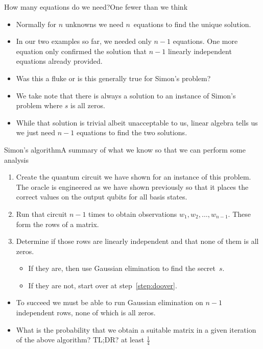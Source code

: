 \begin{frame}{How many equations do we need?}{One fewer than we think}

\begin{itemize}[<+->]
    \item Normally for $n$ unknowns we need $n$~equations to find the unique solution.
    \item In our two examples so far, we needed only $n-1$ equations. One more equation only confirmed the solution that $n-1$ linearly independent equations already provided.
    \item Was this a fluke or is this generally true for Simon's problem?
    \item We take note that there is always a solution to an instance of Simon's problem where $s$ is all zeros.  
    \item While that solution is trivial albeit unacceptable to us, linear algebra tells us we just need $n-1$ equations to find the two solutions.
\end{itemize}
    
\end{frame}

\begin{frame}{Simon's algorithm}{A summary of what we know so that we can perform some analysis}

\begin{enumerate}
    \item Create the quantum circuit we have shown for an instance of this problem.  The oracle is engineered as we have shown previously so that it places the correct values on the output qubits for all basis states.
    \item\label{step:doover} Run that circuit $n-1$ times to obtain observations $w_{1}, w_{2}, \ldots, w_{n-1}$.  These form the rows of a matrix.
    \item Determine if those rows are linearly independent and that none of them is all zeros.
    \begin{itemize}
        \item If they are, then use Gaussian elimination to find the secret~$s$.
        \item If they are not, start over at step~\ref{step:doover}.
    \end{itemize}
\end{enumerate}
\begin{itemize}
    \item<2-> To succeed we must be able to run Gaussian elimination on $n-1$ independent rows, none of which is all zeros.
    \item<3-> What is the probability that we obtain a suitable matrix in a given iteration of the above algorithm?  \alert{TL;DR? at least $\frac{1}{4}$}
\end{itemize}
\end{frame}

